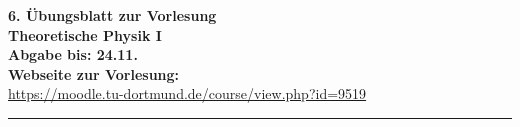 \newenvironment{exercise}
[2]
{\addtocounter{exercise}{1}{\bfseries{Aufgabe \arabic{exercise}:~#1}\hfill(#2 Punkte)}\newline}
{\medskip}

\setlength{\parindent}{0mm}

{\large\bfseries 6. Übungsblatt zur Vorlesung\hfill\thesemester}\\ %
{\large\bfseries Theoretische Physik I\hfill\theprofessor}\\
{\large\bfseries Abgabe bis: 24.11.}\\
\textbf{Webseite zur Vorlesung: \\}
\url{https://moodle.tu-dortmund.de/course/view.php?id=9519} \\
\rule{\columnwidth}{0.1ex}
\medskip
